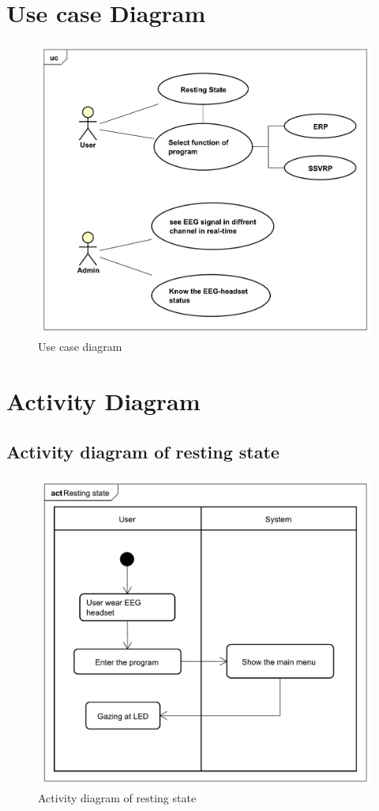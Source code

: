 \section{Use case Diagram}
\begin{figure}[ht]
	\centering
	\includegraphics[scale = 0.5]{chapter4/uc.pdf}
	\caption{Use case diagram}
\end{figure}

\newpage
\section{Activity Diagram}
\subsection{Activity diagram of resting state}
\begin{figure}[ht]
	\centering
	\includegraphics[scale = 0.33]{chapter4/Rest.pdf}
	\caption{Activity diagram of resting state}
\end{figure}

